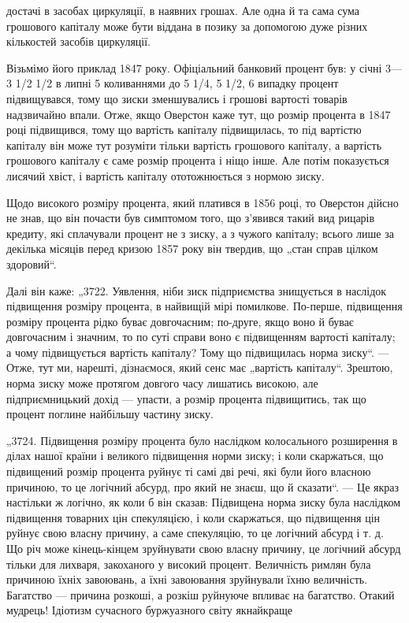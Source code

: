 достачі в засобах циркуляції, в наявних грошах. Але одна й та сама
сума грошового капіталу може бути віддана в позику за допомогою дуже різних кількостей засобів
циркуляції.

Візьмімо його приклад 1847 року. Офіціальний банковий процент був: у січні 3—3 1/2%
1/2%
в липні 5%
коливаннями до 5 1/4, 5 1/2, 6%
випадку процент підвищувався,
тому що зиски зменшувались і грошові вартості товарів надзвичайно впали. Отже, якщо Оверстон каже
тут, що розмір процента
в 1847 році підвищився, тому що вартість капіталу підвищилась,
то під вартістю капіталу він може тут розуміти тільки вартість
грошового капіталу, а вартість грошового капіталу є саме розмір
процента і ніщо інше. Але потім показується лисячий хвіст,
і вартість капіталу ототожнюється з нормою зиску.

Щодо високого розміру процента, який платився в 1856 році,
то Оверстон дійсно не знав, що він почасти був симптомом того,
що з’явився такий вид рицарів кредиту, які сплачували процент
не з зиску, а з чужого капіталу; всього лише за декілька місяців
перед кризою 1857 року він твердив, що „стан справ цілком
здоровий“.

Далі він каже: „3722. Уявлення, ніби зиск підприємства знищується в наслідок підвищення розміру
процента, в найвищій
мірі помилкове. По-перше, підвищення розміру процента рідко
буває довгочасним; по-друге, якщо воно й буває довгочасним
і значним, то по суті справи воно є підвищенням вартості капіталу; а чому підвищується вартість
капіталу? Тому що підвищилась норма зиску“. — Отже, тут ми, нарешті, дізнаємося,
який сенс має „вартість капіталу“. Зрештою, норма зиску може
протягом довгого часу лишатись високою, але підприємницький
дохід — упасти, а розмір процента підвищитись, так що процент поглине найбільшу частину зиску.

„3724. Підвищення розміру процента було наслідком колосального
розширення в ділах нашої країни і великого підвищення норми зиску; і коли скаржаться, що підвищений
розмір
процента руйнує ті самі дві речі, які були його власною причиною, то це логічний абсурд, про який не
знаєш, що й сказати“. — Це якраз настільки ж логічно, як коли б він сказав:
Підвищена норма зиску була наслідком підвищення товарних
цін спекуляцією, і коли скаржаться, що підвищення цін руйнує
свою власну причину, а саме спекуляцію, то це логічний абсурд
і т. д. Що річ може кінець-кінцем зруйнувати свою власну причину, це логічний абсурд тільки для
лихваря, закоханого у високий процент. Величність римлян була причиною їхніх завоювань,
а їхні завоювання зруйнували їхню величність. Багатство — причина
розкоші, а розкіш руйнуюче впливає на багатство. Отакий
мудрець! Ідіотизм сучасного буржуазного світу якнайкраще
